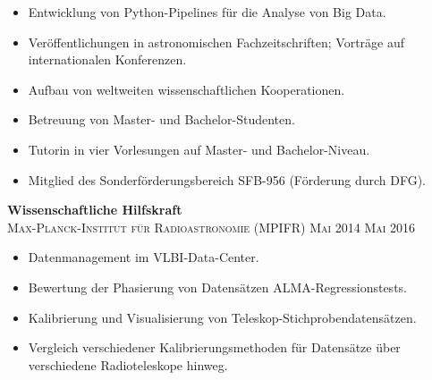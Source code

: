 \documentclass[oneside]{article}
\begin{document}
{\begin{minipage}[t][\dimexpr\textheight-2\fboxrule-2\fboxsep\relax][t]{\dimexpr0.60\textwidth-2\fboxrule-2\fboxsep\relax}
        \begin{itemize}
            \setlength{\itemsep}{-3pt}
            \footnotesize
            \item Entwicklung von Python-Pipelines f\"ur die Analyse von Big Data.
            \item Ver\"offentlichungen in astronomischen Fachzeitschriften; Vortr\"age auf internationalen Konferenzen.
            \item Aufbau von weltweiten wissenschaftlichen Kooperationen.
            \item Betreuung von Master- und Bachelor-Studenten.
            \item Tutorin in vier Vorlesungen auf Master- und Bachelor-Niveau.
            \item Mitglied des Sonderförderungsbereich SFB-956 (F\"orderung durch DFG).
        \end{itemize}
        {\large \textbf{Wissenschaftliche Hilfskraft}} \\
        {\scshape{}\selectfont\footnotesize Max-Planck-Institut f\"ur Radioastronomie (MPIFR) \qquad Mai 2014 \textendash{} Mai 2016} \\
        \begin{itemize}
            \setlength{\itemsep}{-3pt}
            \footnotesize
            \item Datenmanagement im VLBI-Data-Center.
            \item Bewertung der Phasierung von Datens\"atzen ALMA-Regressionstests.
            \item Kalibrierung und Visualisierung von Teleskop-Stichprobendatens\"atzen.
            \item Vergleich verschiedener Kalibrierungsmethoden f\"ur Datens\"atze \"uber verschiedene Radioteleskope hinweg.
        \end{itemize}

\end{minipage}}
\end{document}
